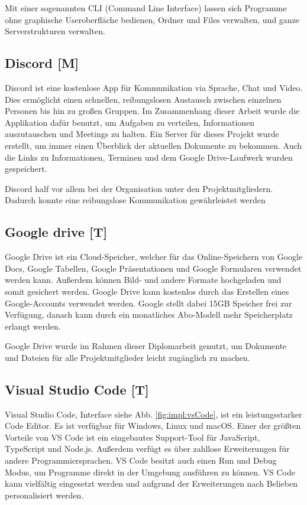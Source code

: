 Mit einer sogenannten CLI (Command Line Interface) lassen sich Programme ohne graphische Useroberfläche bedienen, Ordner und Files verwalten, und ganze Serverstrukturen verwalten. 
\subsection{Discord [M]} 
Discord ist eine kostenlose App für Kommunikation via Sprache, Chat und Video. Dies ermöglicht einen schnellen, reibungslosen Austausch zwischen einzelnen Personen bis hin zu großen Gruppen. Im Zusammenhang dieser Arbeit wurde die Applikation dafür benutzt, um Aufgaben zu verteilen, Informationen auszutauschen und Meetings zu halten. Ein Server für dieses Projekt wurde erstellt, um immer einen Überblick der aktuellen Dokumente zu bekommen. Auch die Links zu Informationen, Terminen und dem Google Drive-Laufwerk wurden gespeichert.   

Discord half vor allem bei der Organisation unter den Projektmitgliedern. Dadurch konnte eine reibungslose Kommunikation gewährleistet werden  
\subsection{Google drive [T]} 

Google Drive ist ein Cloud-Speicher, welcher für das Online-Speichern von Google Docs, Google Tabellen, Google Präsentationen und Google Formularen verwendet werden kann. Außerdem können Bild- und andere Formate hochgeladen und somit gesichert werden. Google Drive kann kostenlos durch das Erstellen eines Google-Accounts verwendet werden. Google stellt dabei 15GB Speicher frei zur Verfügung, danach kann durch ein monatliches Abo-Modell mehr Speicherplatz erlangt werden. \cite{OneDriveOfficialSite}

Google Drive wurde im Rahmen dieser Diplomarbeit genutzt, um Dokumente und Dateien für alle Projektmitglieder leicht zugänglich zu machen.

\subsection{Visual Studio Code [T]} 
Visual Studio Code, Interface siehe Abb. \ref{fig:impl:vsCode}, ist ein leistungsstarker Code Editor. Es ist verfügbar für Windows, Linux und macOS. 
Einer der größten Vorteile von VS Code ist ein eingebautes Support-Tool für JavaScript, TypeScript und Node.js. Außerdem verfügt es über zahllose Erweiterungen für andere Programmiersprachen. VS Code besitzt auch einen Run und Debug Modus, um Programme direkt in der Umgebung ausführen zu können. 
VS Code kann vielfältig eingesetzt werden und aufgrund der Erweiterungen nach Belieben personalisiert werden. \cite{VSCodeOfficialSite}

